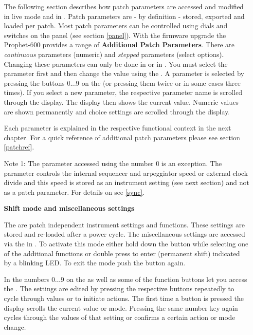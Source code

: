 \documentclass[landscape, 11pt, oneside, twoside]{report}
\newenvironment{flowtext}{\addmargin[0cm]{0cm}}{\endaddmargin} %
\begin{document}
\begin{flowtext}
The following section describes how patch parameters are accessed and modified in live mode and in \presetpanel. Patch parameters are - by definition - stored, exported and loaded per patch. Most patch parameters can be controlled using dials and switches on the panel (see section \ref{panel}). With the firmware upgrade the Prophet-600 provides a range of \textbf{Additional Patch Parameters}. There are \textit{continuous} parameters (numeric) and \textit{stepped} parameters (select options). Changing these parameters can only be done in \presetpanel or in \livemode. You must select the parameter first and then change the value using the \datadial. A parameter is selected by pressing the buttons 0...9 on the \termnumberpad (or pressing them twice or in some cases three times). If you select a new parameter, the respective parameter name is scrolled through the display. The display then shows the current value. Numeric values are shown permanently and choice settings are scrolled through the display. 

Each parameter is explained in the respective functional context in the next chapter. For a quick reference of additional patch parameters please see section \ref{patchref}. 

Note 1: The parameter accessed using the number 0 is an exception. The parameter \clock controls the internal sequencer and arpeggiator speed or external clock divide and this speed is stored as an instrument setting (see next section) and not as a patch parameter. For details on \clock see \ref{sync}.


\textbf{Shift mode and miscellaneous settings}

The \miscsett are patch independent instrument settings and functions. These settings are stored and re-loaded after a power cycle. The miscellaneous settings are accessed via the \termnumberpad in \shiftmode. To activate this mode either hold down the button \fromtape while selecting one of the additional functions or double press \fromtape to enter \shiftlock (permanent shift) indicated by a blinking \fromtape LED. To exit the mode push the button again. 

In \shiftmode the numbers 0...9 on the \termnumberpad as well as some of the function buttons let you access the \miscsett. The settings are edited by pressing the respective buttons repeatedly to cycle through values or to initiate actions. The first time a button is pressed the display scrolls the current value or mode. Pressing the same number key again cycles through the values of that setting or confirms a certain action or mode change. 


\end{flowtext}
\end{document}
